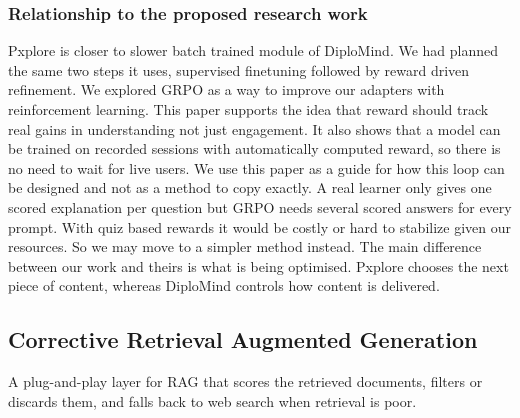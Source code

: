 \documentclass{FastFyp}
\begin{document}
\subsubsection{Relationship to the proposed research work}
Pxplore is closer to slower batch trained module of DiploMind. We had planned the same two steps it uses, supervised finetuning followed by reward driven refinement. We explored GRPO \cite{shao2024deepseekmath} as a way to improve our adapters with reinforcement learning. This paper supports the idea that reward should track real gains in understanding not just engagement. It also shows that a model can be trained on recorded sessions with automatically computed reward, so there is no need to wait for live users. We use this paper as a guide for how this loop can be designed and not as a method to copy exactly. A real learner only gives one scored explanation per question but GRPO needs several scored answers for every prompt. With quiz based rewards it would be costly or hard to stabilize given our resources. So we may move to a simpler method instead. The main difference between our work and theirs is what is being optimised. Pxplore chooses the next piece of content, whereas DiploMind controls how content is delivered.


\subsection{Corrective Retrieval Augmented Generation}
A plug-and-play layer for RAG that scores the retrieved documents, filters or discards them, and falls back to web search when retrieval is poor.
\end{document}
